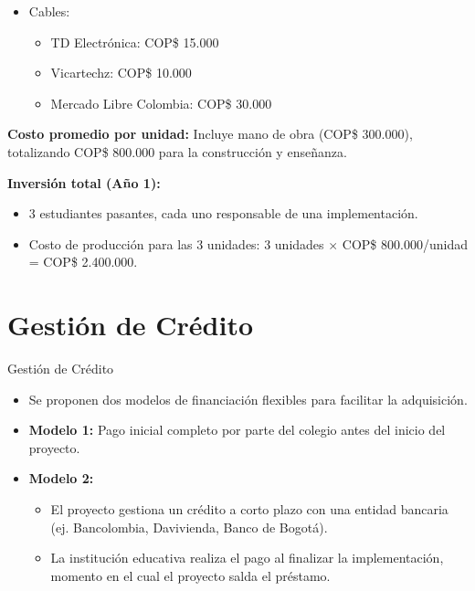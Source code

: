 \begin{frame}
    \begin{itemize}
        \item Cables:
            \begin{itemize}
                \item TD Electrónica: COP\$ 15.000
                \item Vicartechz: COP\$ 10.000
                \item Mercado Libre Colombia: COP\$ 30.000
            \end{itemize}
        \end{itemize}
        \item \textbf{Costo promedio por unidad:} Incluye mano de obra 
            (COP\$ 300.000), totalizando COP\$ 800.000 para la construcción y 
            enseñanza.
        \item \textbf{Inversión total (Año 1):}
        \begin{itemize}
            \item 3 estudiantes pasantes, cada uno responsable de una 
                implementación.
            \item Costo de producción para las 3 unidades: 3 unidades 
                $\times$ COP\$ 800.000/unidad = COP\$ 2.400.000.
    \end{itemize}
\end{frame}

\section{Gestión de Crédito}

\begin{frame}{Gestión de Crédito}
    \begin{itemize}
        \item Se proponen dos modelos de financiación flexibles para facilitar 
            la adquisición.
        \item \textbf{Modelo 1:} Pago inicial completo por parte del colegio 
            antes del inicio del proyecto.
        \item \textbf{Modelo 2:}
        \begin{itemize}
            \item El proyecto gestiona un crédito a corto plazo con una entidad 
                bancaria (ej. Bancolombia, Davivienda, Banco de Bogotá).
            \item La institución educativa realiza el pago al finalizar la 
                implementación, momento en el cual el proyecto salda el préstamo.
        \end{itemize}
    \end{itemize}
\end{frame}

